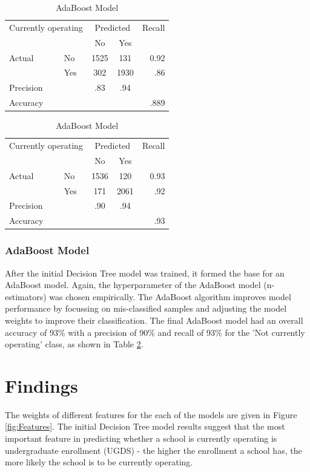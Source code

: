 \documentclass[11pt, letterpaper]{article}
\begin{document}
\begin{table}[h]
 	\caption{Confusion matrices and Evaluation metrics} 
 	\begin{minipage}{.5\linewidth}
		\caption{Decision Tree Model}
		\centering
		\begin{tabular}{l l | c c r }
\multicolumn{2}{l}{Currently operating} & \multicolumn{2}{c}{Predicted} & Recall \\
& & No & Yes &  \\ 
\cline{2-5}
Actual & No & 1525 &  131 & 0.92 \\
& Yes & 302 &1930 & .86 \\  \hline
Precision&  & .83 & .94 \\ 
Accuracy & & &  & .889 \\
	\end{tabular}
	\label{tab:DTConfusion}
	\end{minipage}%
	\begin{minipage}{.5\linewidth}
	\caption{AdaBoost Model}
	\centering
		\begin{tabular}{l l | c c r }
\multicolumn{2}{l}{Currently operating} & \multicolumn{2}{c}{Predicted} & Recall \\
& & No & Yes &  \\ 
\cline{2-5}
Actual & No & 1536 &  120 & 0.93 \\
& Yes & 171 & 2061 & .92 \\  \hline
Precision&  & .90 & .94 \\ 
Accuracy & & &  & .93 \\
	\end{tabular}
	\label{tab:ABConfusion}
	\end{minipage}
\end{table} 

\subsubsection{AdaBoost Model}
After the initial Decision Tree model was trained, it formed the base for an AdaBoost model. Again, the hyperparameter of the AdaBoost model (n-estimators) was chosen empirically. The AdaBoost algorithm improves model performance by focussing on mis-classified samples and adjusting the model weights to improve their classification. The final AdaBoost model had an overall accuracy of 93\% with a precision of 90\% and recall of 93\% for the 'Not currently operating' class, as shown in Table \ref{tab:ABConfusion}.

\section{Findings}
The weights of different features for the each of the models are given in Figure \ref{fig:Features}. The initial Decision Tree model results suggest that the most important feature in predicting whether a school is currently operating is undergraduate enrollment (UGDS) - the higher the enrollment a school has, the more likely the school is to be currently operating.
\end{document}
